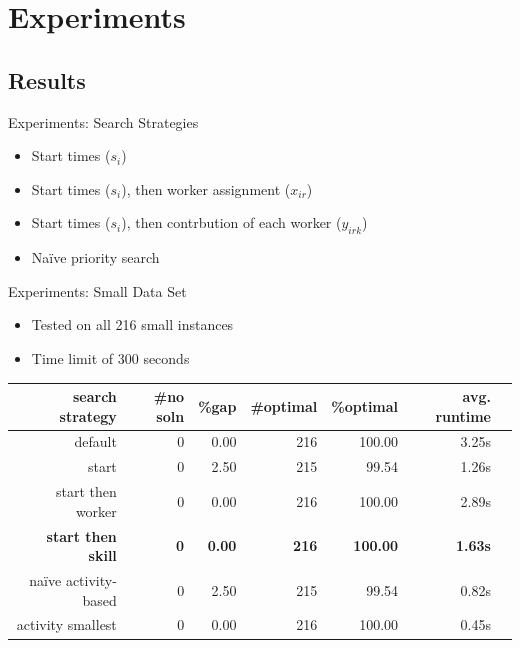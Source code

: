 \documentclass{beamer}
\begin{document}
\section{Experiments}

\subsection{Results}
\begin{frame}{Experiments: Search Strategies}
	\begin{itemize}
		\item \pause Start times ($s_i$)
		\vspace{2mm}
		\item \pause Start times ($s_i$), then worker assignment ($x_{ir}$)
		\vspace{2mm}
		\item \pause Start times ($s_i$), then contrbution of each worker ($y_{irk}$)
		\vspace{2mm}
		\item \pause Na\"{i}ve priority search
	\end{itemize}
\end{frame}

\begin{frame}{Experiments: Small Data Set}
	\begin{itemize}
		\item Tested on all 216 small instances
		\item Time limit of 300 seconds \pause
	\end{itemize}
	\begin{table}[H]
		\begin{adjustwidth}{-.9in}{-.9in}
		\centering
		\scriptsize
		\begin{tabular}{r|rrrrrr}
			\hline
			search strategy & \#no soln & \%gap & \#optimal & \%optimal & avg. runtime  \\
			\hline
			default & 0 & 0.00 & 216 & 100.00 & 3.25s \\
			start &  0 & 2.50 & 215 & 99.54 & 1.26s \\
			start then worker & 0 & 0.00 & 216 & 100.00 & 2.89s \\
			\bf{start then skill} & \bf{0} & \bf{0.00} & \bf{216} & \bf{100.00} & \bf{1.63s} \\
			na\"{i}ve activity-based & 0 & 2.50 & 215 & 99.54 & 0.82s\\\pause
			activity smallest & 0 & 0.00 & 216 & 100.00 & 0.45s\\\hline
		\end{tabular}
		\end{adjustwidth}
	\end{table}
\end{frame}
\end{document}
